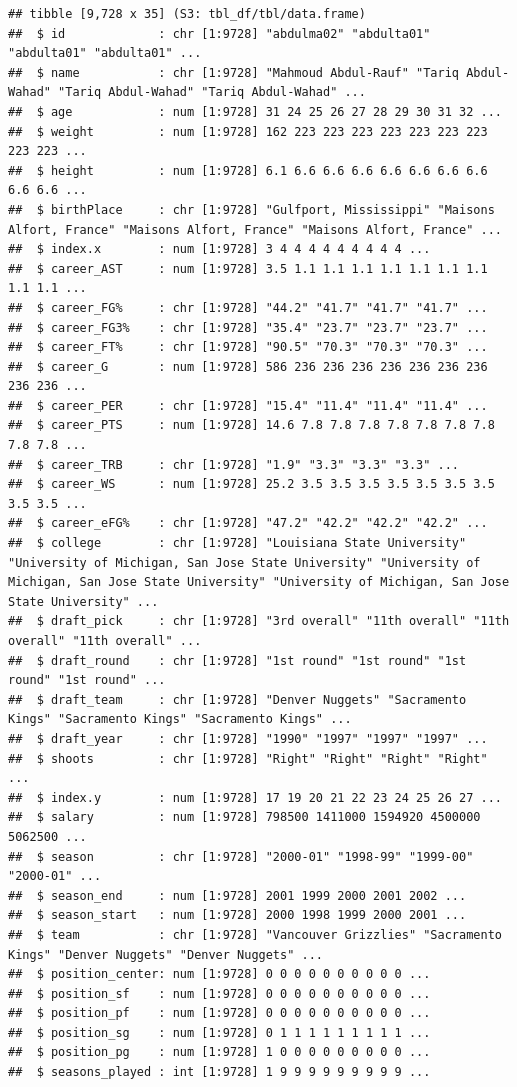 \documentclass[
]{book}
\begin{document}
\begin{verbatim}
## tibble [9,728 x 35] (S3: tbl_df/tbl/data.frame)
##  $ id             : chr [1:9728] "abdulma02" "abdulta01" "abdulta01" "abdulta01" ...
##  $ name           : chr [1:9728] "Mahmoud Abdul-Rauf" "Tariq Abdul-Wahad" "Tariq Abdul-Wahad" "Tariq Abdul-Wahad" ...
##  $ age            : num [1:9728] 31 24 25 26 27 28 29 30 31 32 ...
##  $ weight         : num [1:9728] 162 223 223 223 223 223 223 223 223 223 ...
##  $ height         : num [1:9728] 6.1 6.6 6.6 6.6 6.6 6.6 6.6 6.6 6.6 6.6 ...
##  $ birthPlace     : chr [1:9728] "Gulfport, Mississippi" "Maisons Alfort, France" "Maisons Alfort, France" "Maisons Alfort, France" ...
##  $ index.x        : num [1:9728] 3 4 4 4 4 4 4 4 4 4 ...
##  $ career_AST     : num [1:9728] 3.5 1.1 1.1 1.1 1.1 1.1 1.1 1.1 1.1 1.1 ...
##  $ career_FG%     : chr [1:9728] "44.2" "41.7" "41.7" "41.7" ...
##  $ career_FG3%    : chr [1:9728] "35.4" "23.7" "23.7" "23.7" ...
##  $ career_FT%     : chr [1:9728] "90.5" "70.3" "70.3" "70.3" ...
##  $ career_G       : num [1:9728] 586 236 236 236 236 236 236 236 236 236 ...
##  $ career_PER     : chr [1:9728] "15.4" "11.4" "11.4" "11.4" ...
##  $ career_PTS     : num [1:9728] 14.6 7.8 7.8 7.8 7.8 7.8 7.8 7.8 7.8 7.8 ...
##  $ career_TRB     : chr [1:9728] "1.9" "3.3" "3.3" "3.3" ...
##  $ career_WS      : num [1:9728] 25.2 3.5 3.5 3.5 3.5 3.5 3.5 3.5 3.5 3.5 ...
##  $ career_eFG%    : chr [1:9728] "47.2" "42.2" "42.2" "42.2" ...
##  $ college        : chr [1:9728] "Louisiana State University" "University of Michigan, San Jose State University" "University of Michigan, San Jose State University" "University of Michigan, San Jose State University" ...
##  $ draft_pick     : chr [1:9728] "3rd overall" "11th overall" "11th overall" "11th overall" ...
##  $ draft_round    : chr [1:9728] "1st round" "1st round" "1st round" "1st round" ...
##  $ draft_team     : chr [1:9728] "Denver Nuggets" "Sacramento Kings" "Sacramento Kings" "Sacramento Kings" ...
##  $ draft_year     : chr [1:9728] "1990" "1997" "1997" "1997" ...
##  $ shoots         : chr [1:9728] "Right" "Right" "Right" "Right" ...
##  $ index.y        : num [1:9728] 17 19 20 21 22 23 24 25 26 27 ...
##  $ salary         : num [1:9728] 798500 1411000 1594920 4500000 5062500 ...
##  $ season         : chr [1:9728] "2000-01" "1998-99" "1999-00" "2000-01" ...
##  $ season_end     : num [1:9728] 2001 1999 2000 2001 2002 ...
##  $ season_start   : num [1:9728] 2000 1998 1999 2000 2001 ...
##  $ team           : chr [1:9728] "Vancouver Grizzlies" "Sacramento Kings" "Denver Nuggets" "Denver Nuggets" ...
##  $ position_center: num [1:9728] 0 0 0 0 0 0 0 0 0 0 ...
##  $ position_sf    : num [1:9728] 0 0 0 0 0 0 0 0 0 0 ...
##  $ position_pf    : num [1:9728] 0 0 0 0 0 0 0 0 0 0 ...
##  $ position_sg    : num [1:9728] 0 1 1 1 1 1 1 1 1 1 ...
##  $ position_pg    : num [1:9728] 1 0 0 0 0 0 0 0 0 0 ...
##  $ seasons_played : int [1:9728] 1 9 9 9 9 9 9 9 9 9 ...
\end{verbatim}
\end{document}
